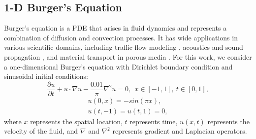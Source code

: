 \documentclass{article}
\begin{document}
\subsection{1-D Burger’s Equation}
Burger's equation is a PDE that arises in fluid dynamics and represents a combination of diffusion and convection processes.
It has wide applications in various scientific domains, including traffic flow modeling \citep{nagatani2000density}, acoustics and sound propagation \citep{naugolnykh2000nonlinear}, and material transport in porous media \citep{shah2016solution}.
For this work, we consider a one-dimensional Burger's equation with Dirichlet boundary condition and sinusoidal initial conditions:
\begin{equation}
\frac{\partial u}{\partial t} + u \cdot \nabla u  - \frac{0.01}{\pi} \nabla^2 u = 0, ~~ x \in [-1,1], ~ t\in [0,1],
\end{equation} 
\vspace{-0.65cm}
\begin{gather*}
    u(0,x) = - sin(\pi x), \\
    u(t,-1) = u(t,1) = 0,
\end{gather*}
where $x$ represents the spatial location, $t$ represents time, $u (x,t)$ represents the velocity of the fluid, and $\nabla$ and $\nabla^2$ represents gradient and Laplacian operators.
\end{document}
